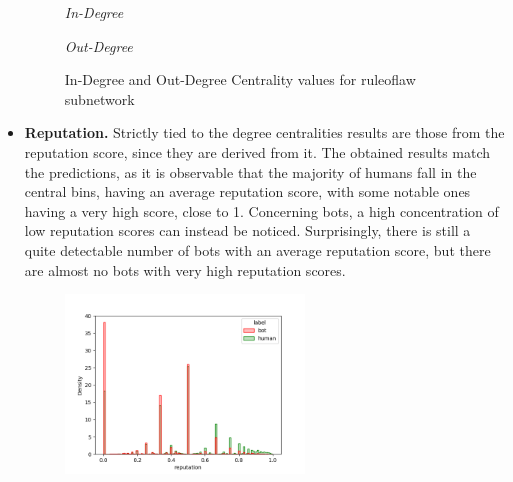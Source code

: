 \documentclass[12pt, a4paper]{article}
\begin{document}
\begin{itemize}
\begin{figure}[H]
\begin{minipage}[b]{0.49\textwidth}
        				\textit{\small In-Degree}
    				\end{minipage}
    				\hfill
    				\begin{minipage}[b]{0.49\textwidth}
        				\centering
        				\setlength{\fboxsep}{0pt}
    					\setlength{\fboxrule}{0.5pt}
        				\textit{\small Out-Degree}
    				\end{minipage}
    				\caption{In-Degree and Out-Degree Centrality values for ruleoflaw subnetwork}
				\end{figure}
			\item \textbf{Reputation.} Strictly tied to the degree centralities results are those from the reputation score, since they are derived from it.
                The obtained results match the predictions, as it is observable that the majority of humans fall in the central bins, having an average reputation score, with some notable ones having a very high score, close to 1. Concerning bots, a high concentration of low reputation scores can instead be noticed. Surprisingly, there is still a quite detectable number of bots with an average reputation score, but there are almost no bots with very high reputation scores.
                \begin{figure}[H]
                	\centering
                    \includegraphics[width=0.6\textwidth]{complete_reputation_distribution.png}

\end{figure}
\end{itemize}
\end{document}
